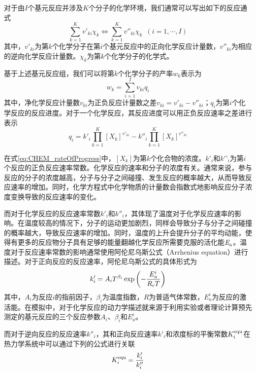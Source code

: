 对于由$I$个基元反应并涉及$K$个分子的化学环境，我们通常可以写出如下的反应通式
\begin{equation}
    \sum_{k=1}^Kv'_{ki}\chi_k\Leftrightarrow \sum_{k=1}^K v''_{ki}\chi_k\enspace\left(i=1,\cdots,I\right)
\end{equation}
其中，$v'_{ki}$为第$k$个化学分子在第$i$个基元反应中的正向化学反应计量数，$v''_{ki}$为相应的逆向化学反应计量数。$\chi_k$为第$k$个化学分子的化学式。

基于上述基元反应组，我们可以将第$k$个化学分子的产率$w_k$表示为\chinesecolon
\begin{equation}
    w_k=\sum_{i=1}^Iv_{ki}q_i
\end{equation}
其中，净化学反应计量数$v_{ki}$为正负反应计量数之差$v_{ki}=v'_{ki}-v''_{ki}$；$q_i$为第$i$个化学反应的反应进度。对于一个化学反应，其反应进度可以用正负反应速率之差进行表示\chinesecolon
\begin{equation}
    \label{eq:CHEM_rateOfProgress}
    q_i=k'_i\prod_{k=1}^{K}\left[X_k\right]^{v'_{ki}}-k''_i\prod_{k=1}^{K}\left[X_k\right]^{v''_{ki}}
\end{equation}

在式\ref{eq:CHEM_rateOfProgress}中，$\left[X_k\right]$为第$k$个化合物的浓度。$k'_i$和$k'’_i$为第$i$个反应的正负反应速率常数。化学反应的速率和分子的浓度有关。通常来说，参与反应的分子的浓度越高，分子与分子之间碰撞、发生反应的概率越大，从而导致反应速率的增加。同时，化学方程式中化学物质的计量数会指数式地影响反应分子浓度变换导致的反应速率的变化。

而对于化学反应的反应速率常数$k'_i$和$k''_i$，其体现了温度对于化学反应速率的影响。在温度较高的情况下，分子的运动更加剧烈，同样会导致分子与分子之间碰撞的概率越大，导致反应速率的增加。同时，温度的上升会提升分子的平均动能，使得有更多的反应物分子具有足够的能量翻越化学反应所需要克服的活化能$\it E_{\rm a}^{\rm } \it$。温度对于反应速率常数的影响通常使用阿伦尼乌斯公式（Arrhenius equation）进行描述。对于正向反应的反应速率，阿伦尼乌斯公式的具体形式为\chinesecolon
\begin{equation}
    k'_i=A_iT^{\beta_i}\exp\left(-\frac{E_a^i}{R_{\rm c}T}\right)
\end{equation}
其中，$A_i$为反应$i$的指前因子，$\beta_i$为温度指数，$R$为普适气体常数，$E_a^i$为反应的激活能。在模拟中，对于化学反应的动力学描述就来源于利用实验或者理论计算预先测定的基元反应的三个反应参数$A_i$、$\beta_i$和$E_a^i$。

而对于逆向反应的反应速率$k''_i$，其和正向反应速率$k'_i$和浓度标的平衡常数$K_i^{\rm equ}$在热力学系统中可以通过下列的公式进行关联\chinesecolon
\[
    K_i^{\rm equ}=\frac{k'_i}{k''_i}
\]

